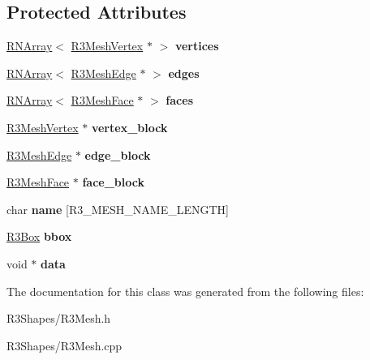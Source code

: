 \subsection*{Protected Attributes}
\begin{DoxyCompactItemize}
\item 
\hyperlink{class_r_n_array}{R\+N\+Array}$<$ \hyperlink{class_r3_mesh_vertex}{R3\+Mesh\+Vertex} $\ast$ $>$ {\bfseries vertices}\hypertarget{class_r3_mesh_a005544046454e43914ab48a3521fb116}{}\label{class_r3_mesh_a005544046454e43914ab48a3521fb116}

\item 
\hyperlink{class_r_n_array}{R\+N\+Array}$<$ \hyperlink{class_r3_mesh_edge}{R3\+Mesh\+Edge} $\ast$ $>$ {\bfseries edges}\hypertarget{class_r3_mesh_a857f8d5edefca79447aae12e7f43af5c}{}\label{class_r3_mesh_a857f8d5edefca79447aae12e7f43af5c}

\item 
\hyperlink{class_r_n_array}{R\+N\+Array}$<$ \hyperlink{class_r3_mesh_face}{R3\+Mesh\+Face} $\ast$ $>$ {\bfseries faces}\hypertarget{class_r3_mesh_a525054f6c0b9551c737cc35f6483da47}{}\label{class_r3_mesh_a525054f6c0b9551c737cc35f6483da47}

\item 
\hyperlink{class_r3_mesh_vertex}{R3\+Mesh\+Vertex} $\ast$ {\bfseries vertex\+\_\+block}\hypertarget{class_r3_mesh_afc370f84fa4e2dd32abc8d398a4499ae}{}\label{class_r3_mesh_afc370f84fa4e2dd32abc8d398a4499ae}

\item 
\hyperlink{class_r3_mesh_edge}{R3\+Mesh\+Edge} $\ast$ {\bfseries edge\+\_\+block}\hypertarget{class_r3_mesh_affaca7562022138c4181917e52c184a6}{}\label{class_r3_mesh_affaca7562022138c4181917e52c184a6}

\item 
\hyperlink{class_r3_mesh_face}{R3\+Mesh\+Face} $\ast$ {\bfseries face\+\_\+block}\hypertarget{class_r3_mesh_a654c8797a57384dbf01bbb48452fb498}{}\label{class_r3_mesh_a654c8797a57384dbf01bbb48452fb498}

\item 
char {\bfseries name} \mbox{[}R3\+\_\+\+M\+E\+S\+H\+\_\+\+N\+A\+M\+E\+\_\+\+L\+E\+N\+G\+TH\mbox{]}\hypertarget{class_r3_mesh_a5bfee3ea319c4f16e8d8caba8553995c}{}\label{class_r3_mesh_a5bfee3ea319c4f16e8d8caba8553995c}

\item 
\hyperlink{class_r3_box}{R3\+Box} {\bfseries bbox}\hypertarget{class_r3_mesh_a8c0483315e6f1307a7b27210f46b77bf}{}\label{class_r3_mesh_a8c0483315e6f1307a7b27210f46b77bf}

\item 
void $\ast$ {\bfseries data}\hypertarget{class_r3_mesh_adb5ad54b0097d26ced0af469e7b0f1dd}{}\label{class_r3_mesh_adb5ad54b0097d26ced0af469e7b0f1dd}

\end{DoxyCompactItemize}


The documentation for this class was generated from the following files\+:\begin{DoxyCompactItemize}
\item 
R3\+Shapes/R3\+Mesh.\+h\item 
R3\+Shapes/R3\+Mesh.\+cpp\end{DoxyCompactItemize}
